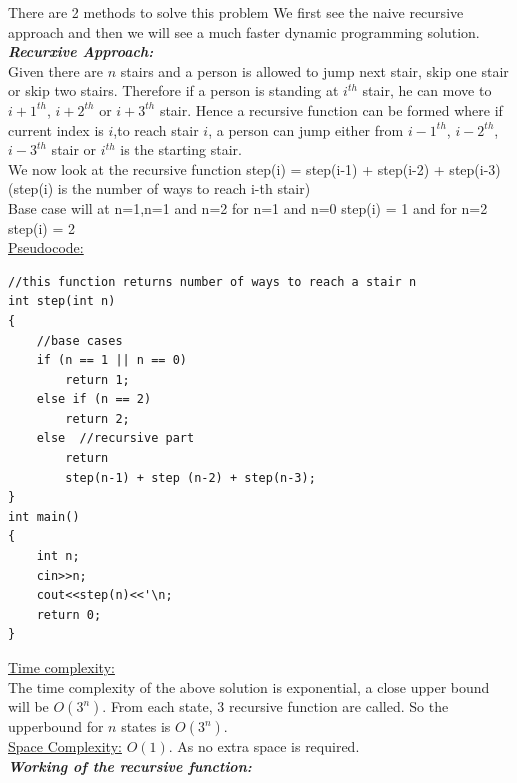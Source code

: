\documentclass[12pt]{book}
\begin{document}
There are 2 methods to solve this problem\newline
We first see the naive recursive approach and then we will see a much faster dynamic programming solution.\\

\textbf{\textit{Recurxive Approach:}}\\
Given there are $n$ stairs and a person is allowed to jump next stair, skip one stair or skip two stairs. Therefore if a person is standing at $i^{th}$ stair, he can move to $i+1^{th}$, $i+2^{th}$ or $i+3^{th}$ stair. Hence a recursive function can be formed where if current index is $i$,to reach stair $i$, a person can jump either from $i-1^{th}$, $i-2^{th}$, $i-3^{th}$ stair or $i^{th}$ is the starting stair.\\
We now look at the recursive function\newline
\newline
step(i) = step(i-1) + step(i-2) + step(i-3)\newline
(step(i) is the number of ways to reach i-th stair)\\

Base case will at n=1,n=1 and n=2 for n=1 and n=0 step(i) = 1 and for n=2 step(i) = 2\\

\underline{Pseudocode:}\\

\begin{lstlisting}
//this function returns number of ways to reach a stair n
int step(int n)
{
    //base cases
    if (n == 1 || n == 0)
        return 1;
    else if (n == 2)
        return 2;
    else  //recursive part 
        return
        step(n-1) + step (n-2) + step(n-3);
}
int main()
{
    int n;
    cin>>n;
    cout<<step(n)<<'\n;
    return 0;
}
\end{lstlisting}

\underline{Time complexity:}\\
The time complexity of the above solution is exponential, a close upper bound will be $O(3^n)$. From each state, 3 recursive function are called. So the upperbound for $n$ states is $O(3^n)$.\\

\underline{Space Complexity:} $O(1)$.\newline
As no extra space is required.\\

\textbf{\textit{Working of the recursive function:}}\\
\end{document}

